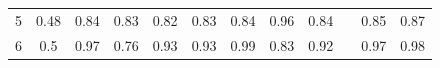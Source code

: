 \documentclass[twoside,11pt]{article}
\begin{document}
\begin{table}[H]
{\begin{tabular}{ccccccccclcc}
\multicolumn{1}{|c|}{5}                                                                           & \multicolumn{1}{c|}{0.48}                                                           & \multicolumn{1}{c|}{\cellcolor[HTML]{ECF4FF}0.84}                                              & \multicolumn{1}{c|}{0.83}                                                                & \multicolumn{1}{c|}{0.82}                                                                & \multicolumn{1}{c|}{0.83}                                                                & \multicolumn{1}{c|}{\cellcolor[HTML]{ECF4FF}0.84}                                           & \multicolumn{1}{c|}{\cellcolor[HTML]{FFCCC9}0.96}                                           & \multicolumn{1}{c|}{\cellcolor[HTML]{ECF4FF}0.84}                                           & \multicolumn{1}{l|}{}                    & \multicolumn{1}{c|}{0.85}                                                                      & \multicolumn{1}{c|}{0.87}                                                                      \\ \cline{1-1}
\multicolumn{1}{|c|}{6}                                                                           & \multicolumn{1}{c|}{0.5}                                                            & \multicolumn{1}{c|}{\cellcolor[HTML]{ECF4FF}0.97}                                              & \multicolumn{1}{c|}{0.76}                                                                & \multicolumn{1}{c|}{0.93}                                                                & \multicolumn{1}{c|}{0.93}                                                                & \multicolumn{1}{c|}{\cellcolor[HTML]{FFCCC9}0.99}                                           & \multicolumn{1}{c|}{0.83}                                                                   & \multicolumn{1}{c|}{0.92}                                                                   & \multicolumn{1}{l|}{}                    & \multicolumn{1}{c|}{0.97}                                                                      & \multicolumn{1}{c|}{0.98}                                                                      \\ \cline{1-1}

\end{tabular}}
\end{table}
\end{document}
